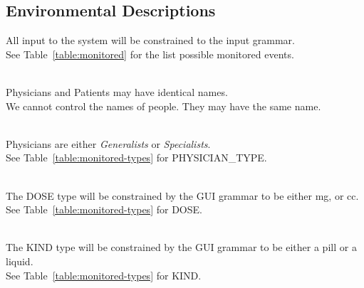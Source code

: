 \subsection{Environmental Descriptions}
{All input to the system will be constrained to the input grammar.\\}
{ See Table~\ref{table:monitored} for the list possible monitored events.\\~}
\label{E1}

{Physicians and Patients may have identical names.\\}
{ We cannot control the names of people. They may have the same name. \\~}
\label{E2}

{Physicians are either \textit{Generalists} or \textit{Specialists}.\\}
{ See Table~\ref{table:monitored-types} for PHYSICIAN\_TYPE.\\~}
\label{E3}

{The DOSE type will be constrained by the GUI grammar to be either mg, or cc.\\}
{ See Table~\ref{table:monitored-types} for DOSE.\\~}
\label{E4}

{The KIND type will be constrained by the GUI grammar to be either a pill or a liquid.\\}
{ See Table~\ref{table:monitored-types} for KIND.\\~}
\label{E5}